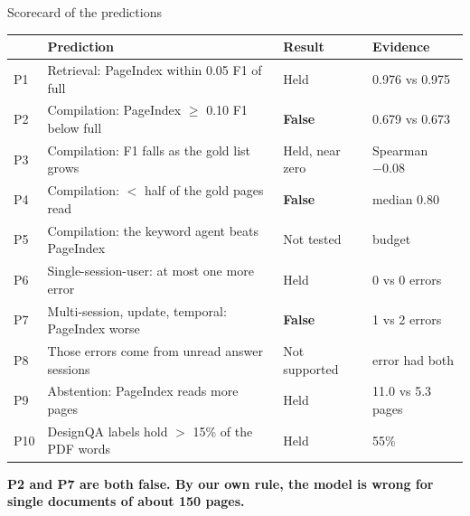 \documentclass[aspectratio=169,11pt]{beamer}
\begin{document}
\begin{frame}{Scorecard of the predictions}
  \vspace{0.02cm}
  {\fontsize{9}{11.2}\selectfont
  \renewcommand{\arraystretch}{1.0}\setlength{\tabcolsep}{4pt}
  \begin{tabular}{@{}p{0.6cm}p{7.3cm}p{2.3cm}p{2.6cm}@{}}
    \toprule
    & Prediction & Result & Evidence \\
    \midrule
    P1 & Retrieval: PageIndex within 0.05 F1 of full & Held & 0.976 vs 0.975 \\
    P2 & Compilation: PageIndex $\geq$ 0.10 F1 below full & \textcolor{Neg}{\textbf{False}} & 0.679 vs 0.673 \\
    P3 & Compilation: F1 falls as the gold list grows & Held, near zero & Spearman $-0.08$ \\
    P4 & Compilation: $<$ half of the gold pages read & \textcolor{Neg}{\textbf{False}} & median 0.80 \\
    P5 & Compilation: the keyword agent beats PageIndex & Not tested & budget \\
    P6 & Single-session-user: at most one more error & Held & 0 vs 0 errors \\
    P7 & Multi-session, update, temporal: PageIndex worse & \textcolor{Neg}{\textbf{False}} & 1 vs 2 errors \\
    P8 & Those errors come from unread answer sessions & Not supported & error had both \\
    P9 & Abstention: PageIndex reads more pages & Held & 11.0 vs 5.3 pages \\
    P10 & DesignQA labels hold $>$ 15\% of the PDF words & Held & 55\% \\
    \bottomrule
  \end{tabular}\par}
  \vspace{0.14cm}
  {\fontsize{11}{14}\selectfont\color{Ink}\bfseries P2 and P7 are both false. By our own rule, the model is wrong for single documents of about 150 pages.\par}
\end{frame}
\end{document}
